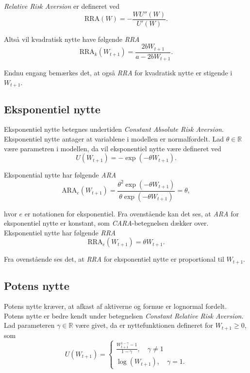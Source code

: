 \documentclass[
  a4paper,
  oneside]{memoir}
\begin{document}
\emph{Relative Risk Aversion} er defineret ved
\[\text{RRA}(W)=-\frac{WU''(W)}{U'(W)}.\]

Altså vil kvadratisk nytte have følgende \emph{RRA}
\[\text{RRA}_k(W_{t+1})= \frac{2bW_{t+1}}{a-2bW_{t+1}}.\]

Endnu engang bemærkes det, at også \emph{RRA} for kvadratisk nytte er stigende i \(W_{t+1}\).

\hypertarget{eksponentiel-nytte-1}{%
\subsection{Eksponentiel nytte}\label{eksponentiel-nytte-1}}

Eksponentiel nytte betegnes undertiden \emph{Constant Absolute Risk Aversion}. Eksponentiel nytte antager at variablene i modellen er normalfordelt. Lad \(\theta\in\mathbb{R}\) være parametren i modellen, da vil eksponentiel nytte være defineret ved
\begin{equation*}
U(W_{t+1})=-\exp\left(-\theta W_{t+1}\right).
\end{equation*}

Eksponential nytte har følgende \emph{ARA}
\[\text{ARA}_e(W_{t+1})=\frac{\theta^2\exp\left(-\theta W_{t+1}\right)}{\theta\exp\left(-\theta W_{t+1}\right)}=\theta,\]

hvor \(e\) er notationen for eksponentiel. Fra ovenstående kan det ses, at \emph{ARA} for eksponentiel nytte er konstant, som \emph{CARA}-betegnelsen dækker over. Eksponentiel nytte har følgende \emph{RRA}
\[\text{RRA}_e(W_{t+1})= \theta W_{t+1}.\]

Fra ovenstående ses det, at \emph{RRA} for eksponentiel nytte er proportional til \(W_{t+1}\).

\hypertarget{potens-nytte-1}{%
\subsection{Potens nytte}\label{potens-nytte-1}}

Potens nytte kræver, at afkast af aktiverne og formue er lognormal fordelt. Potens nytte er bedre kendt under betegnelsen \emph{Constant Relative Risk Aversion}. Lad parameteren \(\gamma\in\mathbb{R}\) være givet, da er nyttefunktionen defineret for \(W_{t+1}\geq 0\), som
\[U(W_{t+1})=\begin{cases} \frac{W_{t+1}^{1-\gamma}-1}{1-\gamma},\quad \gamma\neq 1\\
\log(W_{t+1}),\quad \gamma = 1. \end{cases}\]
\end{document}
